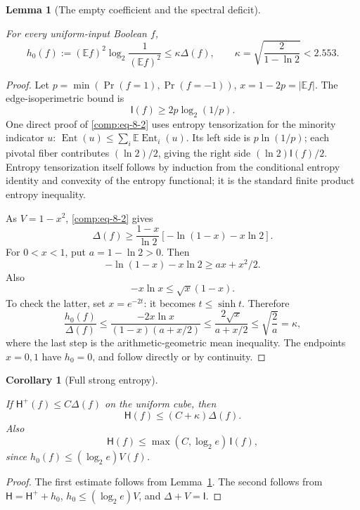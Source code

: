 \documentclass[11pt]{amsart}
\newtheorem{lemma}[theorem]{Lemma}
\newtheorem{corollary}[theorem]{Corollary}
\theoremstyle{definition}
\theoremstyle{remark}
\newcommand{\HH}{\mathsf H}
\newcommand{\I}{\mathsf I}
\begin{document}
\begin{lemma}[The empty coefficient and the spectral deficit]\label{comp:empty-atom}

For every uniform-input Boolean \(f\), \begin{equation}\label{comp:eq-8-1}
h_0(f):=(\mathbb Ef)^2\log_2\frac1{(\mathbb Ef)^2}
       \le\kappa \Delta(f),
 \qquad \kappa=\sqrt{\frac2{1-\ln2}}<2.553.
\end{equation}

\end{lemma}
\begin{proof}

Let \(p=\min(\Pr(f=1),\Pr(f=-1))\), \(x=1-2p=|\mathbb Ef|\). The edge-isoperimetric bound is \begin{equation}\label{comp:eq-8-2}
\I(f)\ge2p\log_2(1/p).
\end{equation} One direct proof of \eqref{comp:eq-8-2} uses entropy tensorization for the minority indicator \(u\): \(\operatorname{Ent}(u)\le\sum_i\mathbb E\operatorname{Ent}_i(u)\). Its left side is \(p\ln(1/p)\); each pivotal fiber contributes \((\ln2)/2\), giving the right side \((\ln2)\I(f)/2\). Entropy tensorization itself follows by induction from the conditional entropy identity and convexity of the entropy functional; it is the standard finite product entropy inequality.

As \(V=1-x^2\), \eqref{comp:eq-8-2} gives \[
 \Delta(f)\ge
 \frac{1-x}{\ln2}
      [-\ln(1-x)-x\ln2].
\] For \(0<x<1\), put \(a=1-\ln2>0\). Then \[
 -\ln(1-x)-x\ln2\ge ax+x^2/2.
\] Also \[
 -x\ln x\le\sqrt x(1-x).
\] To check the latter, set \(x=e^{-2t}\): it becomes \(t\le\sinh t\). Therefore \[
 \frac{h_0(f)}{\Delta(f)}
 \le\frac{-2x\ln x}{(1-x)(a+x/2)}
 \le\frac{2\sqrt x}{a+x/2}
 \le\sqrt{\frac2a}=\kappa,
\] where the last step is the arithmetic-geometric mean inequality. The endpoints \(x=0,1\) have \(h_0=0\), and follow directly or by continuity.

\end{proof}

\begin{corollary}[Full strong entropy]\label{comp:full-entropy}

If \(\HH^+(f)\le C \Delta(f)\) on the uniform cube, then \[
 \HH(f)\le(C+\kappa)\Delta(f).
\] Also \[
 \HH(f)\le\max(C,\log_2e)\,\I(f),
\] since \(h_0(f)\le(\log_2e)V(f)\).

\end{corollary}
\begin{proof}

The first estimate follows from Lemma~\ref{comp:empty-atom}. The second follows from \(\HH=\HH^++h_0\), \(h_0\le(\log_2e)V\), and \(\Delta+V=\I\).

\end{proof}
\end{document}
